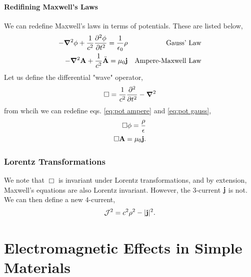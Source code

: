 \documentclass{book}
\begin{document}
\subsubsection{Redifining Maxwell's Laws}
We can redefine Maxwell's laws in terms of potentials. These are listed below,
\begin{align}
	-\grad^2\phi + \frac{1}{c^2}\pdv[2]{\phi}{t} = \frac{1}{\epsilon_0}\rho && \text{Gauss' Law} \label{eq:pot gauss} \\
	-\grad^2\vb{A} + \frac{1}{c^2}\Ddot{\vb{A}} = \mu_0 \vb{j} && \text{Ampere-Maxwell Law} \label{eq:pot ampere}
\end{align}
Let us define the differential "wave" operator,
\begin{equation}
	\Box = \frac{1}{c^2}\pdv[2]{t} - \grad^2
\end{equation}
from whcih we can redefine eqs. \eqref{eq:pot ampere} and \eqref{eq:pot gauss},
\begin{align}
	\Box \phi = \frac{\rho}{\epsilon} \\
	\Box \vb{A} = \mu_0\vb{j}.
\end{align}
\subsection{Lorentz Transformations}
We note that $\Box$ is invariant under Lorentz transformations, and by extension, Maxwell's equations are also Lorentz invariant. However, the 3-current $\vb{j}$ is not. We can then define a new 4-current,
\begin{equation}
	\mathcal{J}^2 = c^2\rho^2 - |\vb{j}|^2.
\end{equation}
\chapter{Electromagnetic Effects in Simple Materials}
\end{document}
